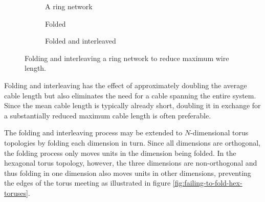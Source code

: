 			\begin{figure}
				\center
				\begin{subfigure}[b]{0.39\linewidth}
					\center
					\caption{A ring network}
					\label{fig:ring-folding-row}
				\end{subfigure}
				\begin{subfigure}[b]{0.24\linewidth}
					\center
					\caption{Folded}
					\label{fig:ring-folding-folded}
				\end{subfigure}
				\begin{subfigure}[b]{0.35\linewidth}
					\center
					\caption{Folded and interleaved}
					\label{fig:ring-folding-interleaved}
				\end{subfigure}
				
				\caption{Folding and interleaving a ring network to reduce maximum wire
				length.}
				\label{fig:ring-folding}
			\end{figure}
			
			Folding and interleaving has the effect of approximately doubling the
			average cable length but also eliminates the need for a cable spanning
			the entire system. Since the mean cable length is typically already
			short, doubling it in exchange for a substantially reduced maximum cable
			length is often preferable.
			
			The folding and interleaving process may be extended to $N$-dimensional
			torus topologies by folding each dimension in turn. Since all dimensions
			are orthogonal, the folding process only moves units in the dimension
			being folded. In the hexagonal torus topology, however, the three
			dimensions are non-orthogonal and thus folding in one dimension also
			moves units in other dimensions, preventing the edges of the torus
			meeting as illustrated in figure \ref{fig:failing-to-fold-hex-toruses}.
			
